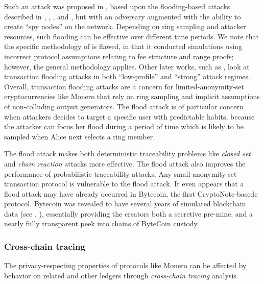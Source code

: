 \documentclass{article}
\theoremstyle{definition}
\begin{document}
Such an attack was proposed in \cite{chervinski2019floodxmr}, based upon the flooding-based attacks described in \cite{noether2014note}, \cite{kumar2017traceability}, \cite{miller2017empirical}, and \cite{moser2017empirical}, but with an adversary augmented with the ability to create ``spy nodes'' on the network.
Depending on ring sampling and attacker resources, such flooding can be effective over different time periods.
We note that the specific methodology of \cite{chervinski2019floodxmr} is flawed, in that it conducted simulations using incorrect protocol assumptions relating to fee structure and range proofs; however, the general methodology applies.
Other later works, such as \cite{chervinski2021analysis}, look at transaction flooding attacks in both ``low-profile'' and ``strong'' attack regimes.
Overall, transaction flooding attacks are a concern for limited-anonymity-set cryptocurrencies like Monero that rely on ring sampling and implicit assumptions of non-colluding output generators.
The flood attack is of particular concern when attackers decides to target a specific user with predictable habits, because the attacker can focus her flood during a period of time which is likely to be sampled when Alice next selects a ring member.

The flood attack makes both deterministic traceability problems like \textit{closed set} and \textit{chain reaction} attacks more effective.
The flood attack also improves the performance of probabilistic traceability attacks.
Any small-anonymity-set transaction protocol is vulnerable to the flood attack.
It even appears that a flood attack may have already occurred in Bytecoin, the first CryptoNote-basedc protocol.
Bytecoin was revealed to have several years of simulated blockchain data (see \cite{bytecoinbad}, \cite{bytecoinbad2}), essentially providing the creators both a secretive pre-mine, and a nearly fully transparent peek into chains of ByteCoin custody.


\subsubsection{Cross-chain tracing}

The privacy-respecting properties of protocols like Monero can be affected by behavior on related and other ledgers through \textit{cross-chain tracing} analysis.
\end{document}
